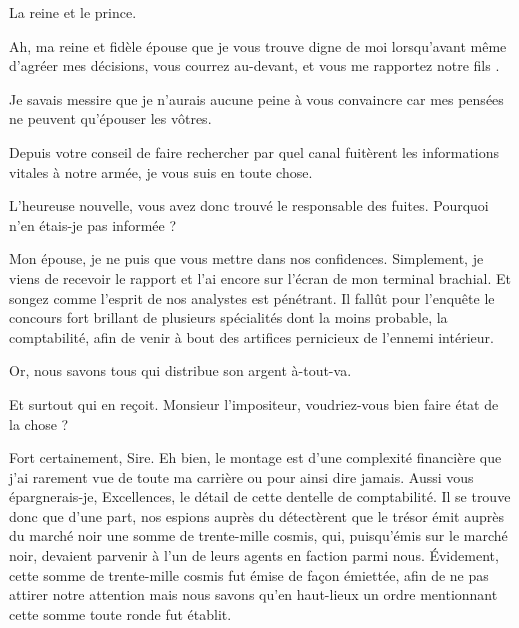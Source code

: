 \scene

\StageDirII{\roi, \reine, \kingsgards, \vladimir}

\newcommand\lacrimamendnote{
  Traduction :
  \begin{verse}
    \em
    Le sang avec une larme ruisselle\\
    Sur les nervures du marbre\\
    Et souille le verre\\
    Que traverse la lumière noire
  \end{verse}
}%


\begin{drama}
  \kingsgardsspeaks La reine et le prince.

  \roispeaks Ah, ma reine et fidèle épouse que je vous trouve digne de moi lorsqu’avant même d’agréer mes décisions, vous courrez au-devant, et vous me rapportez notre fils \vladimir.

  \reinespeaks {} Je savais messire que je n’aurais aucune peine à vous convaincre car mes pensées ne peuvent qu’épouser les vôtres.

  \roispeaks Depuis votre conseil  de faire rechercher par quel canal fuitèrent les informations vitales à notre armée, je vous suis en toute chose.

  \reinespeaks L’heureuse nouvelle, vous avez donc trouvé le responsable des fuites. Pourquoi n’en étais-je pas informée ?

  \roispeaks Mon épouse, je ne puis que vous mettre dans nos confidences. Simplement, je viens de recevoir le rapport et l’ai encore sur l’écran de mon terminal brachial. Et songez comme l’esprit de nos analystes est pénétrant. Il fallût pour l’enquête le concours fort brillant de plusieurs spécialités dont la moins probable, la comptabilité, afin de venir à bout des artifices pernicieux de l’ennemi intérieur.

  \reinespeaks Or, nous savons tous qui distribue son argent à-tout-va.

  \roispeaks Et surtout qui en reçoit. Monsieur l’impositeur, voudriez-vous bien faire état de la chose ?

  \impositeurspeaks Fort certainement, Sire. Eh bien, le montage est d’une complexité financière que j’ai rarement vue de toute ma carrière ou pour ainsi dire jamais. Aussi vous épargnerais-je, Excellences, le détail de cette dentelle de comptabilité. Il se trouve donc que d’une part, nos espions auprès du \campoppose{} détectèrent que le trésor émit auprès du marché noir une somme de trente-mille cosmis, qui, puisqu’émis sur le marché noir, devaient parvenir à l’un de leurs agents en faction parmi nous. 
  Évidement, cette somme de trente-mille cosmis fut émise de façon émiettée, afin de ne pas attirer notre attention mais nous savons qu’en haut-lieux un ordre mentionnant cette somme toute ronde fut établit.


\end{drama}

